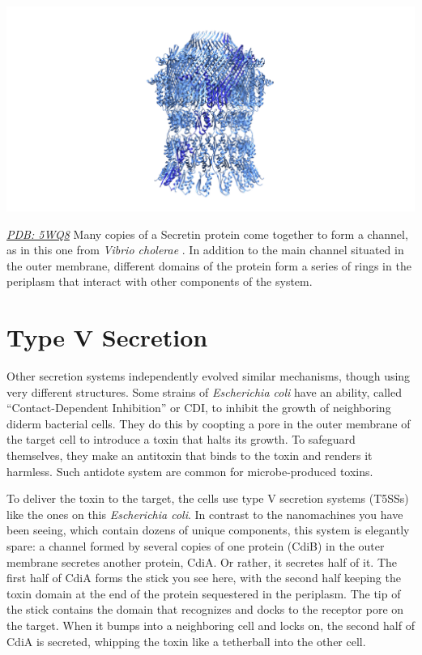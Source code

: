 \documentclass[]{tufte-book}
\begin{document}
\includegraphics{img/schematics/9_4_2}

\href{http://rcsb.org/structure/5WQ8}{\emph{PDB: 5WQ8}}
Many copies of a Secretin protein come together to form a channel, as in this one from \emph{Vibrio cholerae} \citep{yan2017a}. In addition to the main channel situated in the outer membrane, different domains of the protein form a series of rings in the periplasm that interact with other components of the system.

\hypertarget{type-v-secretion}{%
\section{Type V Secretion}\label{type-v-secretion}}

Other secretion systems independently evolved similar mechanisms, though using very different structures. Some strains of \emph{Escherichia coli} have an ability, called ``Contact-Dependent Inhibition'' or CDI, to inhibit the growth of neighboring diderm bacterial cells. They do this by coopting a pore in the outer membrane of the target cell to introduce a toxin that halts its growth. To safeguard themselves, they make an antitoxin that binds to the toxin and renders it harmless. Such antidote system are common for microbe-produced toxins.

To deliver the toxin to the target, the cells use type V secretion systems (T5SSs) like the ones on this \emph{Escherichia coli}. In contrast to the nanomachines you have been seeing, which contain dozens of unique components, this system is elegantly spare: a channel formed by several copies of one protein (CdiB) in the outer membrane secretes another protein, CdiA. Or rather, it secretes half of it. The first half of CdiA forms the stick you see here, with the second half keeping the toxin domain at the end of the protein sequestered in the periplasm. The tip of the stick contains the domain that recognizes and docks to the receptor pore on the target. When it bumps into a neighboring cell and locks on, the second half of CdiA is secreted, whipping the toxin like a tetherball into the other cell.
\end{document}
